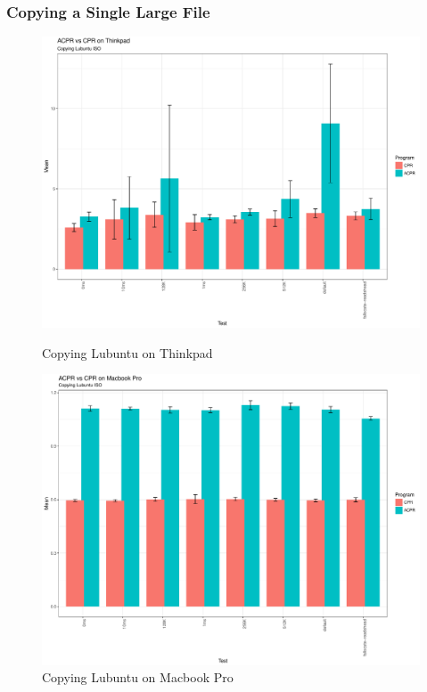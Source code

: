 \documentclass[11pt]{article}
\begin{document}
\subsubsection{Copying a Single Large File} \label{ssubsec:laptops_large}

\begin{figure}[ht!]
        \begin{minipage}{.33\textwidth}
                \includegraphics[width=1.8\textwidth,]{Laptop_Lubuntu_Barplot.pdf}
                \caption{Copying Lubuntu on Thinkpad}
                \label{fig:laptop_lubuntu}
        \end{minipage}
        \hspace{3cm}
        \begin{minipage}{.33\textwidth}
                \centering
                \includegraphics[width=1.8\textwidth,]{Macbook_Lubuntu_Barplot.pdf}
                \caption{Copying Lubuntu on Macbook Pro}
                \label{fig:macbook_lubuntu}
        \end{minipage}
\end{figure}
\end{document}
